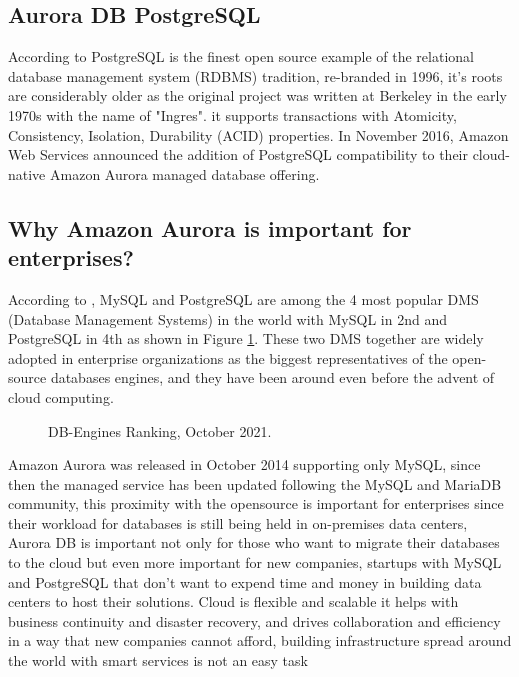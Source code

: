 \documentclass{article}
\begin{document}
\subsection{Aurora DB PostgreSQL}

According to \cite{perkins2018seven} PostgreSQL is the finest open source example of the relational database management system (RDBMS) tradition, re-branded in 1996, it's roots are considerably older as the original project was written at Berkeley in the early 1970s with the name of "Ingres". it supports transactions with Atomicity, Consistency, Isolation, Durability (ACID) properties. In November 2016, Amazon Web Services announced the addition of PostgreSQL compatibility to their cloud-native Amazon Aurora managed database offering. 
\subsection{Why Amazon Aurora is important for enterprises?}
According to \cite{dbengineers2021}, MySQL and PostgreSQL are among the 4 most popular DMS (Database Management Systems) in the world with MySQL in 2nd and PostgreSQL in 4th as shown in Figure \ref{fig:DBRanking}. These two DMS together are widely adopted in enterprise organizations as the biggest representatives of the open-source databases engines, and they have been around even before the advent of cloud computing. 

\begin{figure}[hbt!]
\centering
\caption{\label{fig:DBRanking}DB-Engines Ranking, October 2021.}
\end{figure}

Amazon Aurora was released in October 2014 supporting only MySQL, since then the managed service has been updated following the MySQL and MariaDB community, this proximity with the opensource is important for enterprises since their workload for databases is still being held in on-premises data centers, Aurora DB is important not only for those who want to migrate their databases to the cloud but even more important for new companies, startups with MySQL and PostgreSQL that don’t want to expend time and money in building data centers to host their solutions. Cloud is flexible and scalable it helps with business continuity and disaster recovery, and drives collaboration and efficiency in a way that new companies cannot afford, building infrastructure spread around the world with smart services is not an easy task \cite{mihalec2021}
\end{document}

